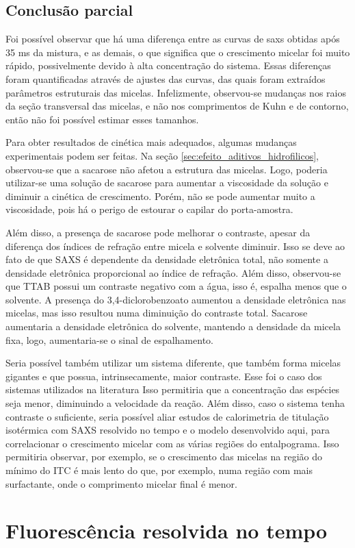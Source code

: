 	\FloatBarrier
	
	\section{Conclusão parcial}
	
	Foi possível observar que há uma diferença entre as curvas de saxs obtidas após 35 ms da mistura, e as demais, o que significa que o crescimento micelar foi muito rápido, possivelmente devido à alta concentração do sistema. Essas diferenças foram quantificadas através de ajustes das curvas, das quais foram extraídos parâmetros estruturais das micelas. Infelizmente, observou-se mudanças nos raios da seção transversal das micelas, e não nos comprimentos de Kuhn e de contorno, então não foi possível estimar esses tamanhos.
	
	Para obter resultados de cinética mais adequados, algumas mudanças experimentais podem ser feitas. Na seção \ref{sec:efeito_aditivos_hidrofilicos}, observou-se que a sacarose não afetou a estrutura das micelas. Logo, poderia utilizar-se uma solução de sacarose para aumentar a viscosidade da solução e diminuir a cinética de crescimento. Porém, não se pode aumentar muito a viscosidade, pois há o perigo de estourar o capilar do porta-amostra.
	
	Além disso, a presença de sacarose pode melhorar o contraste, apesar da diferença dos índices de refração entre micela e solvente diminuir. Isso se deve ao fato de que SAXS é dependente da densidade eletrônica total, não somente a densidade eletrônica proporcional ao índice de refração. Além disso, observou-se que TTAB possui um contraste negativo com a água, isso é, espalha menos que o solvente. A presença do 3,4-diclorobenzoato aumentou a densidade eletrônica nas micelas, mas isso resultou numa diminuição do contraste total. %
	Sacarose aumentaria a densidade eletrônica do solvente, mantendo a densidade da micela fixa, logo, aumentaria-se o sinal de espalhamento.
	
	Seria possível também utilizar um sistema diferente, que também forma micelas gigantes e que possua, intrinsecamente, maior contraste. Esse foi o caso dos sistemas utilizados na literatura %
	Isso permitiria que a concentração das espécies seja menor, diminuindo a velocidade da reação. Além disso, caso o sistema tenha contraste o suficiente, seria possível aliar estudos de calorimetria de titulação isotérmica com SAXS resolvido no tempo e o modelo desenvolvido aqui, para correlacionar o crescimento micelar com as várias regiões do entalpograma. Isso permitiria observar, por exemplo, se o crescimento das micelas na região do mínimo do ITC é mais lento do que, por exemplo, numa região com mais surfactante, onde o comprimento micelar final é menor.
	
	
	
	\chapter{Fluorescência resolvida no tempo}